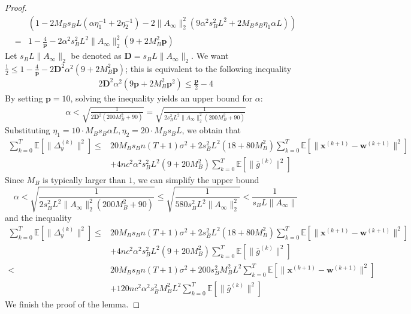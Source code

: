 \documentclass{article}
\newcommand{\vw}{{\mathbf{w}}}
\newcommand{\vx}{{\mathbf{x}}}
\newcommand{\EE}[1]{\mathbb{E}\left[#1\right]}
\newcommand{\norm}[1]{\| #1 \|}
\begin{document}
\begin{proof}
\begin{align*}
  &\left(1-2M_Bs_BL(\alpha\eta_1^{-1}+2\eta_2^{-1})-2\norm{A_{\infty}}_2^2(9\alpha^2s_B^2L^2+2M_Bs_B\eta_1\alpha L) \right)\\ 
  =&1- \frac{4}{\mathbf{p}}-2\alpha^2s_B^2L^2\norm{A_{\infty}}_2^2(9+2M_B^2 \mathbf{p})
\end{align*}
Let $s_BL\norm{A_{\infty}}_2$ be denoted as $\mathbf{D}=s_BL\norm{A_{\infty}}_2$. We want $\frac{1}{2}\leq 1- \frac{4}{\mathbf{p}}-2\mathbf{D}^2\alpha^2(9+2M_B^2 \mathbf{p})$; this is equivalent to the following inequality 
\begin{align*}
  2\mathbf{D}^2\alpha^2(9\mathbf{p}+2M_B^2\mathbf{p}^2)\leq \frac{\mathbf{p}}{2}-4
\end{align*}
By setting $\mathbf{p}=10$, solving the inequality yields an upper bound for $\alpha$:
\begin{align*}
  \alpha < \sqrt{\frac{1}{2\mathbf{D}^2(200M_B^2+90)}} =  \sqrt{\frac{1}{2s_B^2L^2\norm{A_{\infty}}_2^2(200M_B^2+90)}}
\end{align*}
Substituting $\eta_1=10\cdot M_Bs_B\alpha L,\eta_2=20\cdot M_Bs_BL$, we obtain that
\begin{align*}
    \sum_{k=0}^T \EE{\norm{\Delta_y^{(k)}}^2}
  \leq& 20M_Bs_Bn (T+1)\sigma^2+2s_B^2L^2(18+80M_B^2)\sum_{k=0}^T\EE{\norm{\vx^{(k+1)}-\vw^{(k+1)}}^2}\\&+4nc^2\alpha^2s_B^2L^2(9+20M_B^2) \sum_{k=0}^T \EE{\norm{\bar{g}^{(k)}}^2}
\end{align*}
Since $M_B$ is typically larger than $1$, we can simplify the upper bound 
$$\alpha < \sqrt{\frac{1}{2s_B^2L^2\norm{A_{\infty}}_2^2(200M_B^2+90)}}\leq \sqrt{\frac{1}{580s_B^2L^2\norm{A_{\infty}}_2^2}}<\frac{1}{s_BL\norm{A_{\infty}}}$$
and the inequality
\begin{align*}
    \sum_{k=0}^T \EE{\norm{\Delta_y^{(k)}}^2}
  \leq& 20M_Bs_Bn (T+1)\sigma^2+2s_B^2L^2(18+80M_B^2)\sum_{k=0}^T\EE{\norm{\vx^{(k+1)}-\vw^{(k+1)}}^2}\\&+4nc^2\alpha^2s_B^2L^2(9+20M_B^2) \sum_{k=0}^T \EE{\norm{\bar{g}^{(k)}}^2}\\
  <&20M_Bs_Bn (T+1)\sigma^2+200s_B^2M_B^2L^2\sum_{k=0}^T\EE{\norm{\vx^{(k+1)}-\vw^{(k+1)}}^2}\\&+120nc^2\alpha^2s_B^2M_B^2L^2 \sum_{k=0}^T \EE{\norm{\bar{g}^{(k)}}^2}
\end{align*}
We finish the proof of the lemma.
\end{proof}
\end{document}
